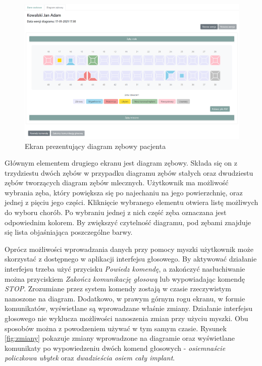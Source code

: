 \begin{figure}[ht!]
\centering\includegraphics[width=\textwidth]{figures/diagram.PNG}
\caption{Ekran prezentujący diagram zębowy pacjenta}
\label{fig:diagram}
\end{figure}

Głównym elementem drugiego ekranu jest diagram zębowy. Składa się on z trzydziestu dwóch zębów w przypadku diagramu zębów stałych oraz dwudziestu zębów tworzących diagram zębów mlecznych. Użytkownik ma możliwość wybrania zęba, który powiększa się po najechaniu na jego powierzchnię, oraz jednej z pięciu jego części. Kliknięcie wybranego elementu otwiera listę możliwych do wyboru chorób. Po wybraniu jednej z nich część zęba oznaczana jest odpowiednim kolorem. By zwiększyć czytelność diagramu, pod zębami znajduje się lista objaśniająca poszczególne barwy.

Oprócz możliwości wprowadzania danych przy pomocy myszki użytkownik może skorzystać z dostępnego w aplikacji interfejsu głosowego. By aktywować działanie interfejsu trzeba użyć przycisku \textit{Powiedz komendę}, a zakończyć nasłuchiwanie można przyciskiem \textit{Zakończ komunikację głosową} lub wypowiadając komendę \textit{STOP}. Zrozumiane przez system komendy zostają w czasie rzeczywistym nanoszone na diagram. Dodatkowo, w prawym górnym rogu ekranu, w formie komunikatów, wyświetlane są wprowadzane właśnie zmiany. Działanie interfejsu głosowego nie wyklucza możliwości nanoszenia zmian przy użyciu myszki. Obu sposobów można z powodzeniem używać w tym samym czasie. Rysunek \ref{fig:zmiany} pokazuje zmiany wprowadzone na diagramie oraz wyświetlane komunikaty po wypowiedzeniu dwóch komend głosowych - \textit{osiemnaście policzkowa ubytek} oraz \textit{dwadzieścia osiem cały implant}.

